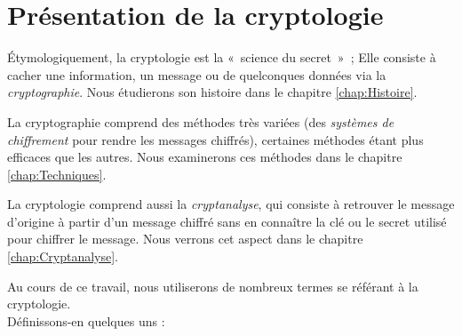 \section{Présentation de la cryptologie}
Étymologiquement, la cryptologie est la «~science du secret~»~;
Elle consiste à cacher une
information, un message ou de quelconques données via la
\emph{cryptographie}. Nous étudierons son histoire
dans le chapitre \ref{chap:Histoire}.

La cryptographie comprend des méthodes très variées (des
\emph{systèmes de chiffrement} pour rendre les messages chiffrés),
certaines méthodes étant plus efficaces que les autres.
Nous examinerons ces méthodes dans le chapitre
\ref{chap:Techniques}.

La cryptologie comprend aussi la \emph{cryptanalyse}, qui consiste à
retrouver le message d'origine à partir d'un message chiffré sans en
connaître la clé ou le secret utilisé pour chiffrer le message.
Nous verrons cet aspect dans le chapitre \ref{chap:Cryptanalyse}.

Au cours de ce travail, nous utiliserons de nombreux termes se référant à
la cryptologie. \\
Définissons-en quelques uns : 


